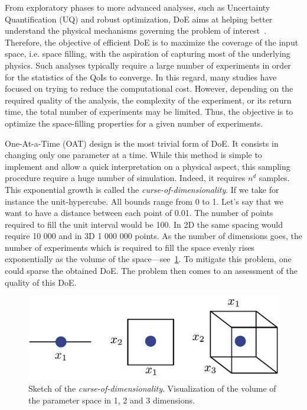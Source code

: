 From exploratory phases to more advanced analyses, such as Uncertainty Quantification (UQ) and robust optimization, DoE aims at helping better understand the physical mechanisms governing the problem of interest~\citep{saltelli2007}. Therefore, the objective of efficient DoE is to maximize the coverage of the input space, i.e. space filling, with the aspiration of capturing most of the underlying physics. Such analyses typically require a large number of experiments in order for the statistics of the QoIs to converge. In this regard, many studies have focused on trying to reduce the computational cost. However, depending on the required quality of the analysis, the complexity of the experiment, or its return time, the total number of experiments may be limited. Thus, the objective is to optimize the space-filling properties for a given number of experiments.

One-At-a-Time (OAT) design is the most trivial form of DoE. It consists in changing only one parameter at a time. While this method is simple to implement and allow a quick interpretation on a physical aspect, this sampling procedure require a huge number of simulation. Indeed, it requires $n^d$ samples. This exponential growth is called the \emph{curse-of-dimensionality}. If we take for instance the unit-hypercube. All bounds range from 0 to 1. Let's say that we want to have a distance between each point of 0.01. The number of points required to fill the unit interval would be 100. In 2D the same spacing would require 10 000 and in 3D 1 000 000 points. As the number of dimensions goes, the number of experiments which is required to fill the space evenly rises exponentially as the volume of the space---see~\cref{fig:curse_dim}. To mitigate this problem, one could sparse the obtained DoE. The problem then comes to an assessment of the quality of this DoE.

\begin{figure}[!h]
\centering
\includegraphics[width=0.8\linewidth,keepaspectratio]{fig/literature/curse_dim.pdf}
\caption{Sketch of the \emph{curse-of-dimensionality}. Visualization of the volume of the parameter space in 1, 2 and 3 dimensions.}
\label{fig:curse_dim}
\end{figure}

